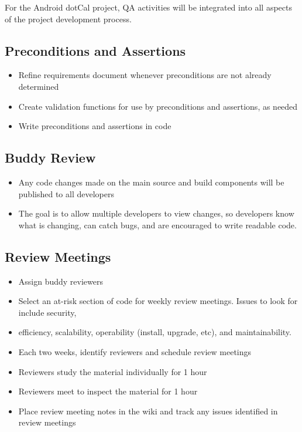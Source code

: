 \documentclass[11pt]{article}
\begin{document}
For the Android dotCal project, QA activities will be integrated into all aspects of the project development process.

\subsection{Preconditions and Assertions}

\begin{itemize}
\item Refine requirements document whenever preconditions are not already determined
\item Create validation functions for use by preconditions and assertions, as needed
\item Write preconditions and assertions in code
\end{itemize}

\subsection{Buddy Review}

\begin{itemize}

\item Any code changes made on the main source and build components will be published to all developers
\item The goal is to allow multiple developers to view changes, so developers know what is changing, can catch bugs, and are encouraged to write readable code.
\end{itemize}

\subsection{Review Meetings}

\begin{itemize}

\item Assign buddy reviewers
\item Select an at-risk section of code for weekly review meetings. Issues to look for include security, \item efficiency, scalability, operability (install, upgrade, etc), and maintainability.
\item Each two weeks, identify reviewers and schedule review meetings
\item Reviewers study the material individually for 1 hour
\item Reviewers meet to inspect the material for 1 hour
\item Place review meeting notes in the wiki and track any issues identified in review meetings
\end{itemize}
\end{document}
